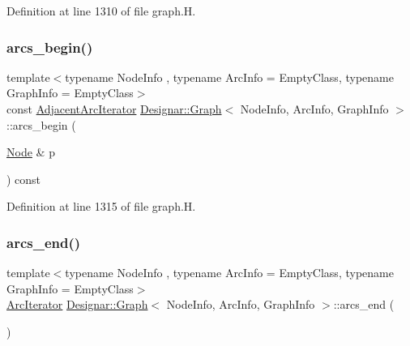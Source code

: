 Definition at line 1310 of file graph.\+H.

\mbox{\label{class_designar_1_1_graph_a2c527f6bddb0ff454fd6139f2437c27b}} 
\subsubsection{\texorpdfstring{arcs\+\_\+begin()}{arcs\_begin()}\hspace{0.1cm}{\footnotesize\ttfamily [4/4]}}
{\footnotesize\ttfamily template$<$typename Node\+Info , typename Arc\+Info  = Empty\+Class, typename Graph\+Info  = Empty\+Class$>$ \\
const \hyperlink{class_designar_1_1_graph_1_1_adjacent_arc_iterator}{Adjacent\+Arc\+Iterator} \hyperlink{class_designar_1_1_graph}{Designar\+::\+Graph}$<$ Node\+Info, Arc\+Info, Graph\+Info $>$\+::arcs\+\_\+begin (\begin{DoxyParamCaption}\item[{\hyperlink{class_designar_1_1_graph_a5dfc7dba9d092ac489c72e40390c37d0}{Node} \&}]{p }\end{DoxyParamCaption}) const\hspace{0.3cm}{\ttfamily [inline]}}



Definition at line 1315 of file graph.\+H.

\mbox{\label{class_designar_1_1_graph_a57a43c94f28df5958e912554d640bdaa}} 
\subsubsection{\texorpdfstring{arcs\+\_\+end()}{arcs\_end()}\hspace{0.1cm}{\footnotesize\ttfamily [1/4]}}
{\footnotesize\ttfamily template$<$typename Node\+Info , typename Arc\+Info  = Empty\+Class, typename Graph\+Info  = Empty\+Class$>$ \\
\hyperlink{class_designar_1_1_graph_1_1_arc_iterator}{Arc\+Iterator} \hyperlink{class_designar_1_1_graph}{Designar\+::\+Graph}$<$ Node\+Info, Arc\+Info, Graph\+Info $>$\+::arcs\+\_\+end (\begin{DoxyParamCaption}{ }\end{DoxyParamCaption})\hspace{0.3cm}{\ttfamily [inline]}}



